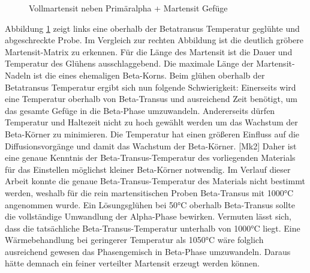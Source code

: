 \documentclass[a4paper, 11pt]{tubsreprt}
\begin{document}
\begin{figure}
\caption{Vollmartensit neben Primäralpha + Martensit Gefüge}
\label{Vollmartensit neben 960}
\end{figure}
Abbildung \ref{Vollmartensit neben 960} zeigt links eine oberhalb der Betatransus Temperatur geglühte und abgeschreckte Probe. Im Vergleich zur rechten Abbildung ist die deutlich gröbere Martensit-Matrix zu erkennen. Für die Länge des Martensit ist die Dauer und Temperatur des Glühens ausschlaggebend. Die maximale Länge der Martensit-Nadeln ist die eines ehemaligen Beta-Korns. Beim glühen oberhalb der Betatransus Temperatur ergibt sich nun folgende Schwierigkeit: Einerseits wird eine Temperatur oberhalb von Beta-Transus und ausreichend Zeit benötigt, um das gesamte Gefüge in die Beta-Phase umzuwandeln. Andererseits dürfen Temperatur und Haltezeit nicht zu hoch gewählt werden um das Wachstum der Beta-Körner zu minimieren. Die Temperatur hat einen größeren Einfluss auf die Diffusionsvorgänge und damit das Wachstum der Beta-Körner. [Mk2] Daher ist eine genaue Kenntnis der Beta-Transus-Temperatur des vorliegenden Materials für das Einstellen möglichst kleiner Beta-Körner notwendig.
Im Verlauf dieser Arbeit konnte die genaue Beta-Transus-Temperatur des Materials nicht bestimmt werden, weshalb für die rein martensitischen Proben Beta-Transus mit 1000°C angenommen wurde. Ein Lösungsglühen bei 50°C oberhalb Beta-Transus sollte die vollständige Umwandlung der Alpha-Phase bewirken. Vermuten lässt sich, dass die tatsächliche Beta-Transus-Temperatur unterhalb von 1000°C liegt. Eine Wärmebehandlung bei geringerer Temperatur als 1050°C wäre folglich ausreichend gewesen das Phasengemisch in Beta-Phase umzuwandeln. Daraus hätte demnach ein feiner verteilter Martensit erzeugt werden können. 
\end{document}
